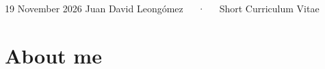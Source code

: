 \documentclass[11pt,a4paper,]{awesome-cv}
\begin{document}
\makecvheader

\makecvfooter
  {19 November 2026}
    {Juan David Leongómez~~~·~~~Short Curriculum Vitae}
  {\thepage}





\section{About me}\label{about-me}
\end{document}
